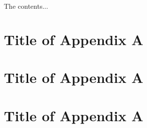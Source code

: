 \documentclass{book}
\begin{document}
\begin{appendices}
The contents...
\appendix
\section{Title of Appendix A}
\appendix
\section{Title of Appendix A}
\appendix
\section{Title of Appendix A}
\end{appendices}
\end{document}
